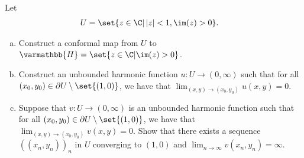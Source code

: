 \documentclass[10pt]{mypackage}
\renewcommand*{\mathbb}[1]{\varmathbb{#1}}
\begin{document}
\begin{problem}[Problem 2]
  Let
  \begin{align*}
    U &= \set{z\in \C | \left\vert z \right\vert < 1,\im(z) > 0}.
  \end{align*}
  \begin{enumerate}[(a)]
    \item Construct a conformal map from $U$ to $ \mathbb{H} = \set{z\in\C | \im(z) > 0} $.
    \item Construct an unbounded harmonic function $u\colon U\rightarrow (0,\infty)$ such that for all $\left( x_0,y_0 \right)\in \partial U \setminus \set{(1,0)}$, we have that $\lim_{\left( x,y \right)\rightarrow \left( x_0,y_0 \right)} u\left( x,y \right) = 0$.
    \item Suppose that $v\colon U\rightarrow (0,\infty)$ is an unbounded harmonic function such that for all $\left( x_0,y_0 \right)\in \partial U\setminus \set{\left( 1,0 \right)}$, we have that $\lim_{\left( x,y \right)\rightarrow \left( x_0,y_0 \right)} v\left( x,y \right) = 0$. Show that there exists a sequence $\left( \left( x_n,y_n \right) \right)_n$ in $U$ converging to $\left( 1,0 \right)$ and $\lim_{n\rightarrow\infty}v\left( x_n,y_n \right) = \infty$.
  \end{enumerate}
\end{problem}
\end{document}

